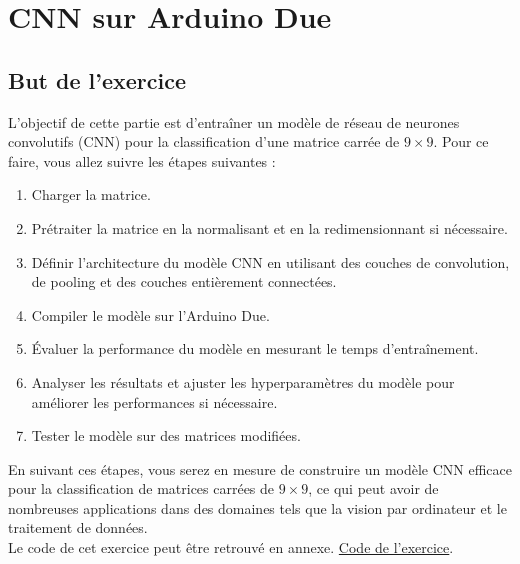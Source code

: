 \chapter{CNN sur Arduino Due}
\section{But de l'exercice}
L'objectif de cette partie est d'entraîner un modèle de réseau de neurones convolutifs (CNN) pour la classification d'une matrice carrée de $9\times9$. Pour ce faire, vous allez suivre les étapes suivantes :
\begin{enumerate}
    \item Charger la matrice.
    \item Prétraiter la matrice en la normalisant et en la redimensionnant si nécessaire.
    \item Définir l'architecture du modèle CNN en utilisant des couches de convolution, de pooling et des couches entièrement connectées.
    \item Compiler le modèle sur l'Arduino Due.
    \item Évaluer la performance du modèle en mesurant le temps d'entraînement.
    \item Analyser les résultats et ajuster les hyperparamètres du modèle pour améliorer les performances si nécessaire.
    \item Tester le modèle sur des matrices modifiées.
\end{enumerate}
En suivant ces étapes, vous serez en mesure de construire un modèle CNN efficace pour la classification de matrices carrées de $9\times9$, ce qui peut avoir de nombreuses applications dans des domaines tels que la vision par ordinateur et le traitement de données. \\

Le code de cet exercice peut être retrouvé en annexe. \hyperref[sec:CNN-code]{Code de l'exercice}.

